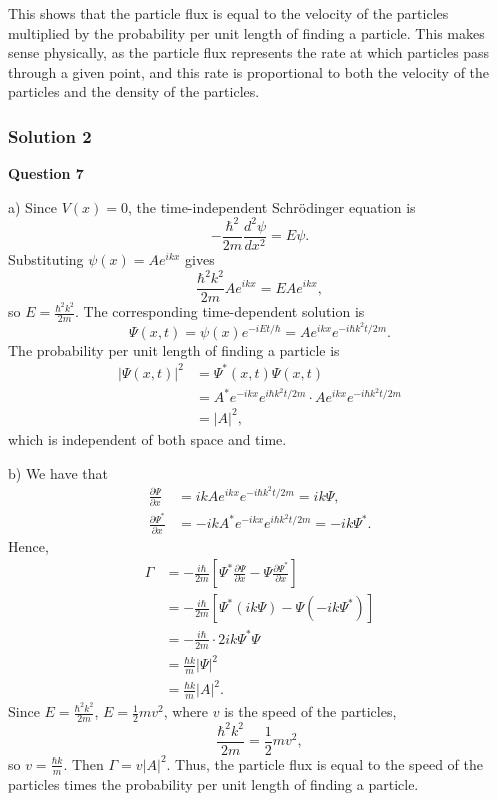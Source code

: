 \documentclass{article}
\begin{document}
This shows that the particle flux is equal to the velocity of the particles multiplied by the probability per unit length of finding a particle. This makes sense physically, as the particle flux represents the rate at which particles pass through a given point, and this rate is proportional to both the velocity of the particles and the density of the particles.


\subsubsection{Solution 2}
\textbf{Question 7}

a)  Since $V(x) = 0$, the time-independent Schrödinger equation is 
\[
-\frac{\hbar^2}{2m} \frac{d^2 \psi}{dx^2} = E \psi.
\]
Substituting $\psi(x) = Ae^{ikx}$ gives
\[
\frac{\hbar^2 k^2}{2m} Ae^{ikx} = E Ae^{ikx},
\]
so $E = \frac{\hbar^2 k^2}{2m}$.  The corresponding time-dependent solution is
\[
\Psi(x,t) = \psi(x) e^{-iEt/\hbar} = A e^{ikx} e^{-i \hbar k^2 t / 2m}.
\]The probability per unit length of finding a particle is
\begin{align*}
|\Psi(x,t)|^2 &= \Psi^*(x,t) \Psi(x,t) \\
&= A^* e^{-ikx} e^{i \hbar k^2 t / 2m} \cdot A e^{ikx} e^{-i \hbar k^2 t / 2m} \\
&= |A|^2,
\end{align*}which is independent of both space and time.

b)  We have that
\begin{align*}
\frac{\partial \Psi}{\partial x} &= ik A e^{ikx} e^{-i \hbar k^2 t / 2m} = ik \Psi, \\
\frac{\partial \Psi^*}{\partial x} &= -ik A^* e^{-ikx} e^{i \hbar k^2 t / 2m} = -ik \Psi^*.
\end{align*}Hence,
\begin{align*}
\Gamma &= -\frac{i \hbar}{2m} \left[ \Psi^* \frac{\partial \Psi}{\partial x} - \Psi \frac{\partial \Psi^*}{\partial x} \right] \\
&= -\frac{i \hbar}{2m} \left[ \Psi^* (ik \Psi) - \Psi (-ik \Psi^*) \right] \\
&= -\frac{i \hbar}{2m} \cdot 2ik \Psi^* \Psi \\
&= \frac{\hbar k}{m} |\Psi|^2 \\
&= \frac{\hbar k}{m} |A|^2.
\end{align*}Since $E = \frac{\hbar^2 k^2}{2m}$, $E = \frac{1}{2} mv^2$, where $v$ is the speed of the particles,
\[
\frac{\hbar^2 k^2}{2m} = \frac{1}{2} mv^2,
\]so $v = \frac{\hbar k}{m}$.  Then $\Gamma = v |A|^2$.  Thus, the particle flux is equal to the speed of the particles times the probability per unit length of finding a particle.
\end{document}
